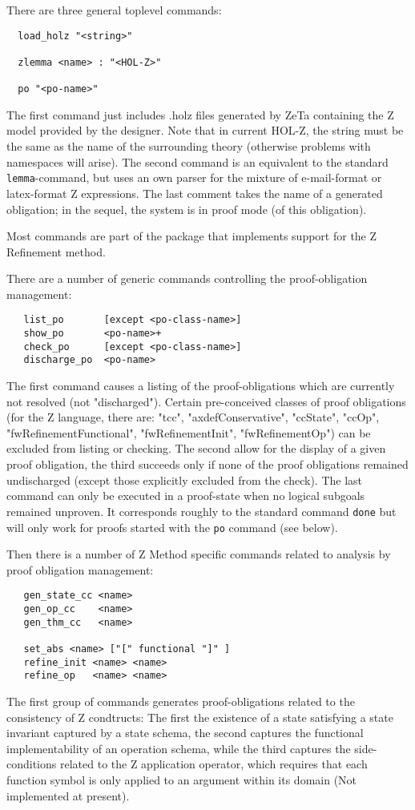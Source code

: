 \documentclass[10pt,a4paper,bigheadings,pdftex,bibtotoc,chapterprefix,appendixprefix,twoside,DIVcalc]{scrbook}
\begin{document}
There are three general toplevel commands:
\begin{verbatim}
  load_holz "<string>"

  zlemma <name> : "<HOL-Z>"

  po "<po-name>"
\end{verbatim}
The first command just includes .holz files generated by ZeTa
containing the Z model provided by the designer. Note that in current
HOL-Z, the string must be the same as the name of the surrounding
theory (otherwise problems with namespaces will arise).  The second
command is an equivalent to the standard \verb+lemma+-command, but
uses an own parser for the mixture of e-mail-format or latex-format Z
expressions.  The last comment takes the name of a generated
obligation; in the sequel, the system is in proof mode (of this
obligation).

Most commands are part of the package that implements support for
the Z Refinement method.

There are a number of generic commands controlling the proof-obligation management:
\begin{verbatim}
   list_po       [except <po-class-name>]
   show_po       <po-name>+
   check_po      [except <po-class-name>]
   discharge_po  <po-name> 
\end{verbatim}
The first command causes a listing of the proof-obligations which are
currently not resolved (not "discharged"). Certain pre-conceived
classes of proof obligations (for the Z language, there are: "tcc",
"axdefConservative", "ccState", "ccOp", "fwRefinementFunctional",
"fwRefinementInit", "fwRefinementOp") can be excluded from listing or checking.
The second allow for the display of a given proof obligation, the third succeeds
only if none of the proof obligations remained undischarged (except those
explicitly excluded from the check). The last command can only be executed in 
a proof-state when no logical subgoals remained unproven. It corresponds roughly to
the standard command \verb+done+ but will only work for proofs started with
the \verb+po+ command (see below).

Then there is a number of Z Method specific commands related to analysis by
proof obligation management:
\begin{verbatim}
   gen_state_cc <name>
   gen_op_cc    <name>
   gen_thm_cc   <name>

   set_abs <name> ["[" functional "]" ]
   refine_init <name> <name>
   refine_op   <name> <name>
\end{verbatim}
The first group of commands generates proof-obligations related to the consistency of
Z condtructs: The first the existence of a state satisfying a state invariant captured
by a state schema, the second captures the functional implementability of an operation schema,
while the third captures the side-conditions related to the Z application operator, which
requires that each function symbol is only applied to an argument within its domain
(Not implemented at present).
\end{document}
